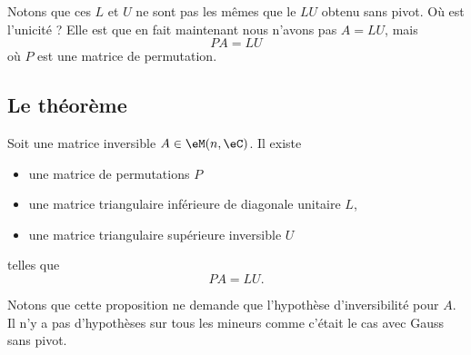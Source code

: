 Notons que ces \( L\) et \( U\) ne sont pas les mêmes que le \( L U\) obtenu sans pivot. Où est l'unicité ? Elle est que en fait maintenant nous n'avons pas \( A=LU\), mais
\begin{equation}
	PA=LU
\end{equation}
où \( P\) est une matrice de permutation.

\subsection{Le théorème}

\begin{proposition}       \label{PROPooGCPAooDrlrGu}
	Soit une matrice inversible \( A\in\eM(n,\eC)\). Il existe
	\begin{itemize}
		\item une matrice de permutations \( P\)
		\item une matrice triangulaire inférieure de diagonale unitaire \( L\),
		\item une matrice triangulaire supérieure inversible \( U\)
	\end{itemize}
	telles que
	\begin{equation}
		PA=LU.
	\end{equation}
\end{proposition}
Notons que cette proposition ne demande que l'hypothèse d'inversibilité pour \( A\). Il n'y a pas d'hypothèses sur tous les mineurs comme c'était le cas avec Gauss sans pivot.

